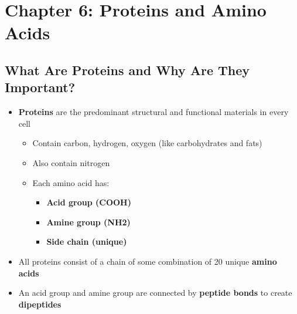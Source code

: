 \documentclass[12pt]{article}
\begin{document}
    \section{Chapter 6: Proteins and Amino Acids}

        \subsection{What Are Proteins and Why Are They Important?}
            \begin{itemize}
                \item \textbf{Proteins} are the predominant structural and functional materials in every cell
                    \begin{itemize}
                        \item Contain carbon, hydrogen, oxygen (like carbohydrates and fats)
                        \item Also contain nitrogen
                        \item Each amino acid has:
                            \begin{itemize}
                                \item \textbf{Acid group (COOH)}
                                \item \textbf{Amine group (NH2)}
                                \item \textbf{Side chain (unique)}
                            \end{itemize}
                    \end{itemize}
                \item All proteins consist of a chain of some combination of 20 unique \textbf{amino acids}
                \item An acid group and amine group are connected by \textbf{peptide bonds} to create \textbf{dipeptides}
            \end{itemize}
\end{document}
